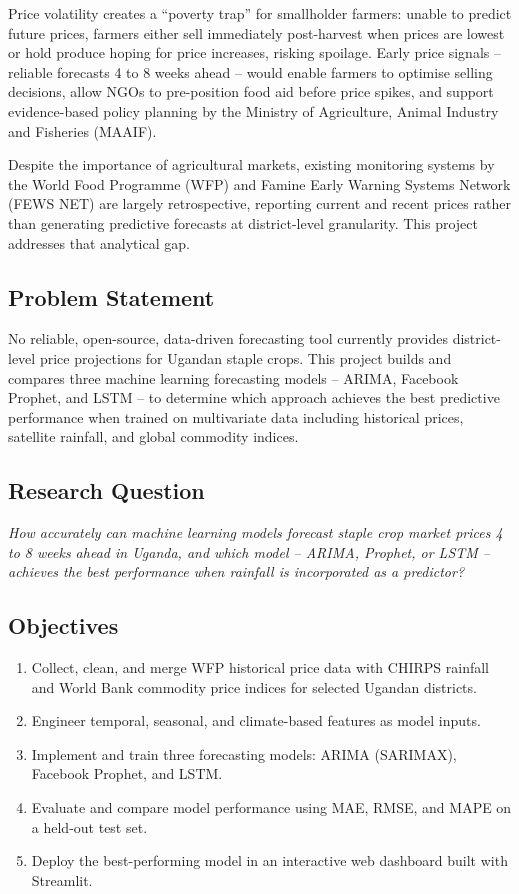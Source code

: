 \documentclass[12pt,a4paper]{article}
\begin{document}
Price volatility creates a ``poverty trap'' for smallholder farmers: unable to predict future prices, farmers either sell immediately post-harvest when prices are lowest or hold produce hoping for price increases, risking spoilage. Early price signals -- reliable forecasts 4 to 8 weeks ahead -- would enable farmers to optimise selling decisions, allow NGOs to pre-position food aid before price spikes, and support evidence-based policy planning by the Ministry of Agriculture, Animal Industry and Fisheries (MAAIF).

Despite the importance of agricultural markets, existing monitoring systems by the World Food Programme (WFP) and Famine Early Warning Systems Network (FEWS NET) are largely retrospective, reporting current and recent prices rather than generating predictive forecasts at district-level granularity. This project addresses that analytical gap.

\subsection{Problem Statement}
No reliable, open-source, data-driven forecasting tool currently provides district-level price projections for Ugandan staple crops. This project builds and compares three machine learning forecasting models -- ARIMA, Facebook Prophet, and LSTM -- to determine which approach achieves the best predictive performance when trained on multivariate data including historical prices, satellite rainfall, and global commodity indices.

\subsection{Research Question}
\textit{How accurately can machine learning models forecast staple crop market prices 4 to 8 weeks ahead in Uganda, and which model -- ARIMA, Prophet, or LSTM -- achieves the best performance when rainfall is incorporated as a predictor?}

\subsection{Objectives}
\begin{enumerate}
    \item Collect, clean, and merge WFP historical price data with CHIRPS rainfall and World Bank commodity price indices for selected Ugandan districts.
    \item Engineer temporal, seasonal, and climate-based features as model inputs.
    \item Implement and train three forecasting models: ARIMA (SARIMAX), Facebook Prophet, and LSTM.
    \item Evaluate and compare model performance using MAE, RMSE, and MAPE on a held-out test set.
    \item Deploy the best-performing model in an interactive web dashboard built with Streamlit.
\end{enumerate}
\end{document}

